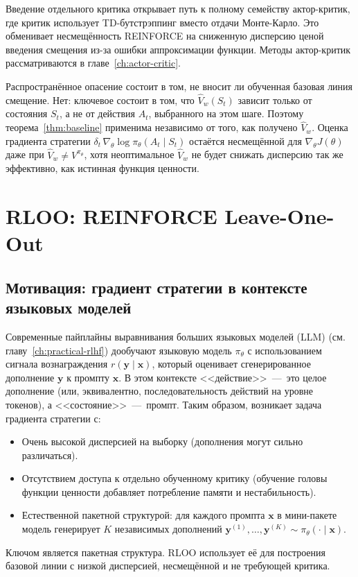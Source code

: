 \begin{remark}
Введение отдельного критика открывает путь к полному семейству актор-критик, где критик использует TD-бутстрэппинг вместо отдачи Монте-Карло. Это обменивает несмещённость REINFORCE на сниженную дисперсию ценой введения смещения из-за ошибки аппроксимации функции. Методы актор-критик рассматриваются в главе~\ref{ch:actor-critic}.
\end{remark}

Распространённое опасение состоит в том, не вносит ли обученная базовая линия смещение. Нет: ключевое состоит в том, что $\hat V_w(S_t)$ зависит только от состояния $S_t$, а не от действия $A_t$, выбранного на этом шаге. Поэтому теорема~\ref{thm:baseline} применима независимо от того, как получено $\hat V_w$. Оценка градиента стратегии $\delta_t\, \nabla_\theta \log \pi_\theta(A_t \mid S_t)$ остаётся несмещённой для $\nabla_\theta J(\theta)$ даже при $\hat V_w \neq V^{\pi_\theta}$, хотя неоптимальное $\hat V_w$ не будет снижать дисперсию так же эффективно, как истинная функция ценности.

\section{RLOO: REINFORCE Leave-One-Out}
\label{sec:rloo}


\subsection{Мотивация: градиент стратегии в контексте языковых моделей}

Современные пайплайны выравнивания больших языковых моделей (LLM) (см. главу~\ref{ch:practical-rlhf}) дообучают языковую модель $\pi_\theta$ с использованием сигнала вознаграждения $r(\mathbf{y} \mid \mathbf{x})$, который оценивает сгенерированное дополнение $\mathbf{y}$ к промпту $\mathbf{x}$. В этом контексте <<действие>> \,---\, это целое дополнение (или, эквивалентно, последовательность действий на уровне токенов), а <<состояние>> \,---\, промпт. Таким образом, возникает задача градиента стратегии с:
\begin{itemize}[leftmargin=*]
\item Очень высокой дисперсией на выборку (дополнения могут сильно различаться).
\item Отсутствием доступа к отдельно обученному критику (обучение головы функции ценности добавляет потребление памяти и нестабильность).
\item Естественной пакетной структурой: для каждого промпта $\mathbf{x}$ в мини-пакете модель генерирует $K$ независимых дополнений $\mathbf{y}^{(1)}, \ldots, \mathbf{y}^{(K)} \sim \pi_\theta(\cdot \mid \mathbf{x})$.
\end{itemize}
Ключом является пакетная структура. RLOO использует её для построения базовой линии с низкой дисперсией, несмещённой и не требующей критика.

